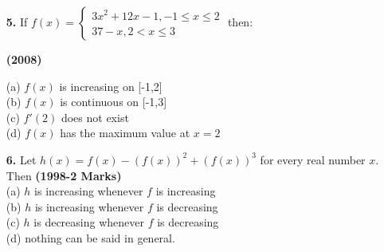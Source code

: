 \documentclass[journal,12pt,twocolumn]{IEEEtran}
\theoremstyle{remark}
\begin{document}
\begin{enumerate}
 \item[\textbf{5.}] If  
 $ f(x)=\begin{cases} 
   3x^2+12x-1,-1 \le x\le 2\\
   37-x ,2<x \le 3
   \end{cases}$ then:
   
   \hfill{\textbf{(2008)}}

   (a) $f(x)$ is increasing on [-1,2]\\
   (b) $f(x)$ is continuous on [-1,3]\\
   (c) $f'(2)$ does not exist\\
   (d) $f(x)$ has the maximum value at $x=2$\\

\item[\textbf{6.}] Let $h(x) = f(x)-(f(x))^2+ (f(x))^3$  for every real number $x.$ Then
\hfill{\textbf{(1998-2 Marks)}}\\
   (a) $h$ is increasing whenever $f$ is increasing\\
   (b) $h$ is increasing whenever $f$ is decreasing\\
   (c) $h$ is decreasing whenever $f$ is decreasing\\
   (d) nothing can be said in general.\\


   

 
 
 

 
 

     
 \end{enumerate}
 

 
\end{document}
